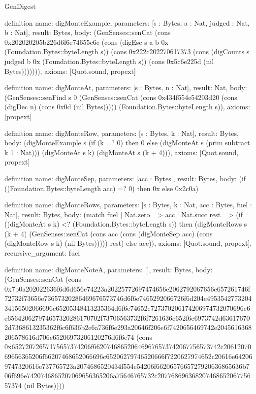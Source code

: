 \begin{lexlean}{GenDigest}
\begin{semanticmodule}
definition{
  name: digMonteExample,
  parameters: [s : Bytes, a : Nat, judged : Nat, b : Nat],
  result: Bytes,
  body: (GenSenses::senCat (cons 0x202020205b226d6f6e74655c6e (cons (digEsc s a b 0x (Foundation.Bytes::byteLength s)) (cons 0x222c202270617373 (cons (digCounts s judged b 0x (Foundation.Bytes::byteLength s)) (cons 0x5c6e225d (nil Bytes))))))),
  axioms: [Quot.sound, propext]
}

definition{
  name: digMonteAt,
  parameters: [s : Bytes, n : Nat],
  result: Nat,
  body: (GenSenses::senFind s 0 (GenSenses::senCat (cons 0x434f554e54203d20 (cons (digDec n) (cons 0x0d (nil Bytes))))) (Foundation.Bytes::byteLength s)),
  axioms: [propext]
}

definition{
  name: digMonteRow,
  parameters: [s : Bytes, k : Nat],
  result: Bytes,
  body: (digMonteExample s (if (k =? 0) then 0 else (digMonteAt s (prim subtract k 1 : Nat))) (digMonteAt s k) (digMonteAt s (k + 4))),
  axioms: [Quot.sound, propext]
}

definition{
  name: digMonteSep,
  parameters: [acc : Bytes],
  result: Bytes,
  body: (if ((Foundation.Bytes::byteLength acc) =? 0) then 0x else 0x2c0a)
}

definition{
  name: digMonteRows,
  parameters: [s : Bytes, k : Nat, acc : Bytes, fuel : Nat],
  result: Bytes,
  body: (match fuel
    | Nat.zero => acc
    | Nat.succ rest => (if ((digMonteAt s k) <? (Foundation.Bytes::byteLength s)) then (digMonteRows s (k + 4) (GenSenses::senCat (cons acc (cons (digMonteSep acc) (cons (digMonteRow s k) (nil Bytes))))) rest) else acc)),
  axioms: [Quot.sound, propext],
  recursive_argument: fuel
}

definition{
  name: digMonteNoteA,
  parameters: [],
  result: Bytes,
  body: (GenSenses::senCat (cons 0x7b0a202022636f6d6d656e74223a20225772697474656e2062792067656e657261746f72732f73656e73657320286469676573746d6f6e7465292066726f6d204e495354277320434156502066696c65205348413235364d6f6e74652e727370206174206974732070696e6e656420627974657320286170702f73706563732f6f7261636c652f6e6973742d636176702d7368613235362f6c6f636b2e6a736f6e293a20646f206e6f7420656469742e2045616368206578616d706c65206973206120276d6f6e74 (cons 0x65272072657175657374206f6620746865206469676573742067756573742c2061207069656365206f66207468652066696c65206279746520666f7220627974652c20616e642069747320616e737765723a2074686520434f554e54206f6620657665727920636865636b706f696e7420746865207069656365206a75646765732c20776869636820746865206775657374 (nil Bytes))))
}


\end{semanticmodule}
\end{lexlean}
